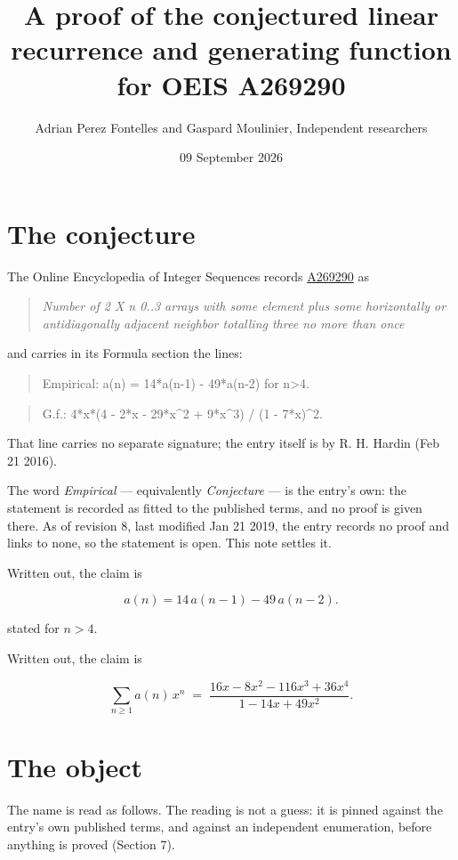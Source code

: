 \documentclass[11pt]{article}
\title{A proof of the conjectured linear recurrence and generating function for OEIS A269290}
\author{Adrian Perez Fontelles and Gaspard Moulinier, Independent researchers}
\date{09 September 2026}
\theoremstyle{definition}
\begin{document}
\maketitle
\section{The conjecture}

The Online Encyclopedia of Integer Sequences records \href{https://oeis.org/A269290}{A269290} as

\begin{quote}\itshape Number of 2 X n 0..3 arrays with some element plus some horizontally or antidiagonally adjacent neighbor totalling three no more than once\end{quote}

and carries in its Formula section the lines:

\begin{quote}\ttfamily Empirical: a(n) = 14*a(n-1) - 49*a(n-2) for n>4.\end{quote}

\begin{quote}\ttfamily G.f.: 4*x*(4 - 2*x - 29*x\textasciicircum{}2 + 9*x\textasciicircum{}3) / (1 - 7*x)\textasciicircum{}2.\end{quote}

That line carries no separate signature; the entry itself is by R. H. Hardin (Feb 21 2016).

The word {\itshape Empirical} --- equivalently {\itshape Conjecture} --- is the entry's own: the statement is recorded as fitted to the published terms, and no proof is given there. As of revision 8, last modified Jan 21 2019, the entry records no proof and links to none, so the statement is open. This note settles it.

Written out, the claim is

\[a(n) = 14\,a(n-1) - 49\,a(n-2).\]

stated for $n > 4$.

Written out, the claim is

\[\sum_{n \ge 1} a(n)\,x^n \;=\; \frac{16x - 8x^{2} - 116x^{3} + 36x^{4}}{1 - 14x + 49x^{2}}.\]

\section{The object}

The name is read as follows. The reading is not a guess: it is pinned against the entry's own published terms, and against an independent enumeration, before anything is proved (Section 7).
\end{document}

